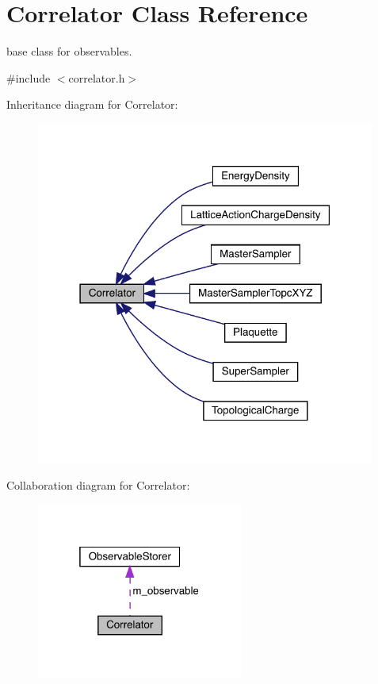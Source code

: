 \hypertarget{class_correlator}{}\section{Correlator Class Reference}
\label{class_correlator}


base class for observables.  




{\ttfamily \#include $<$correlator.\+h$>$}



Inheritance diagram for Correlator\+:\nopagebreak
\begin{figure}[H]
\begin{center}
\leavevmode
\includegraphics[width=316pt]{class_correlator__inherit__graph}
\end{center}
\end{figure}


Collaboration diagram for Correlator\+:\nopagebreak
\begin{figure}[H]
\begin{center}
\leavevmode
\includegraphics[width=193pt]{class_correlator__coll__graph}
\end{center}
\end{figure}
